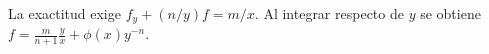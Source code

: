La exactitud exige $f_y+(n/y)f=m/x$. Al integrar respecto de $y$ se obtiene $f=\frac{m}{n+1}\frac yx+\phi(x)y^{-n}$.
